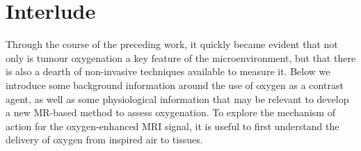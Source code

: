 
\chapter{Interlude}
\label{ch:interlude}
Through the course of the preceding work, it quickly became evident that not only is tumour oxygenation a key feature of the microenvironment, but that there is also a dearth of non-invasive techniques available to measure it.
Below we introduce some background information around the use of oxygen as a contrast agent, as well as some physiological information that may be relevant to develop a new MR-based method to assess oxygenation.
To explore the mechanism of action for the oxygen-enhanced MRI signal, it is useful to first understand the delivery of oxygen from inspired air to tissues.



